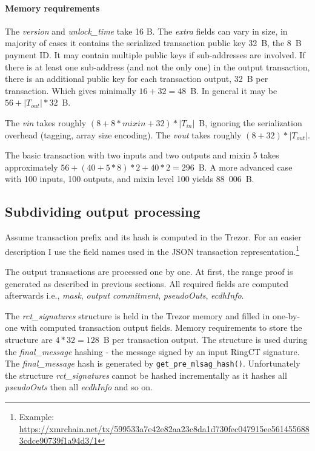 \documentclass[]{article}
\begin{document}
\paragraph{Memory requirements}
The \emph{version} and \emph{unlock\_time} take 16 B. The \emph{extra} fields can vary in size, in majority of cases it contains the serialized transaction public key 32~B, the 8~B payment ID. It may contain multiple public keys if sub-addresses are involved. If there is at least one sub-address (and not the only one) in the output transaction, there is an additional public key for each transaction output, 32~B per transaction. Which gives minimally $16 + 32 = 48$~B. In general it may be $56 + \left|T_{out}\right| * 32$~B.

The \emph{vin} takes roughly $(8 + 8 * mixin + 32) * \left|T_{in}\right|$~B, ignoring the serialization overhead (tagging, array size encoding). The \emph{vout} takes roughly $(8 + 32) * \left|T_{out}\right|$.

The basic transaction with two inputs and two outputs and mixin 5 takes approximately $56 + (40 + 5*8)*2 + 40*2 = 296$~B. A more advanced case with 100 inputs, 100 outputs, and mixin level 100 yields 88~006~B.  

\subsection{Subdividing output processing}
Assume transaction prefix and its hash is computed in the Trezor.
For an easier description I use the field names used in the JSON transaction representation.\footnote{Example: \url{https://xmrchain.net/tx/599533a7e42e82aa23c8da1d730fec047915ee5614556883cdce90739f1a94d3/1}}

The output transactions are processed one by one. At first, the range proof is generated as described in previous sections. All required fields are computed afterwards i.e., \emph{mask}, \emph{output commitment}, \emph{pseudoOuts}, \emph{ecdhInfo}. 

The \emph{rct\_signatures} structure is held in the Trezor memory and filled in one-by-one with computed transaction output fields. Memory requirements to store the structure are $4 * 32 = 128$~B per transaction output. The structure is used during the \emph{final\_message} hashing - the message signed by an input RingCT signature. The \emph{final\_message} hash is generated by \verb|get_pre_mlsag_hash()|. Unfortunately the structure \emph{rct\_signatures} cannot be hashed incrementally as it hashes all \emph{pseudoOuts} then all \emph{ecdhInfo} and so on.
\end{document}
